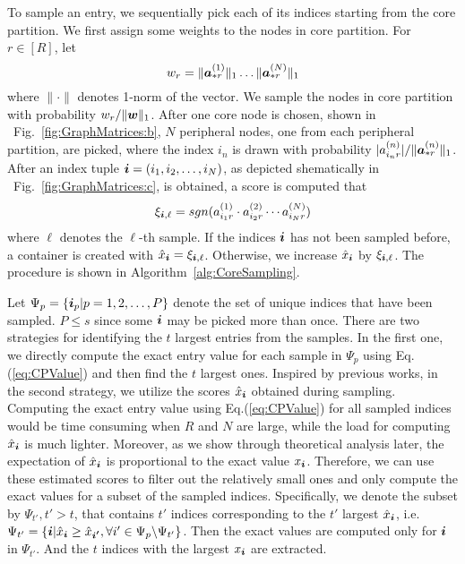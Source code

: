 \documentclass[10pt,journal,compsoc]{IEEEtran}
\newcommand{\Sca}[3]{{#1}^{(#2)}_{i_#2#3}}%
\newcommand{\anr}[2]{\Sca{a}{#1}{#2}}
\newcommand{\score}[1]{\xi_{\V{i},#1}}
\newcommand{\V}[1]{{\boldsymbol{{\MakeLowercase{#1}}}}}
\newcommand{\ColVec}[3]{\V{#1}^{(#2)}_{#3}}
\newcommand{\NormColA}[2]{\norm{\ColVec{a}{#1}{*#2}}{1}}
\newcommand{\ColVecA}[1]{\V{a}^{(#1)}_{*r}}
\newcommand{\coord}{(i_1,i_2,\ldots,i_N)}
\newcommand{\WeightR}{\NormColA{1}{r}\ldots\NormColA{N}{r}}
\newcommand{\predx}{\hat{x}_{\V{i}}}
\newcommand{\norm}[2]{\|#1\|_{#2}}
\newcommand{\Eqn}[1]{Eq.(\ref{eq:#1})}
\newcommand{\Fig}[1]{Fig.~\ref{fig:#1}}
\newcommand{\Alg}[1]{Algorithm~\ref{alg:#1}}
\begin{document}
To sample an entry, we sequentially pick each of its indices starting from the core partition. We first assign some weights to the nodes in core partition. For $r\in[R]$, let
\begin{equation}
w_r = \WeightR
\end{equation}
where $\|\cdot\|$ denotes 1-norm of the vector.
We sample the nodes in core partition with probability $w_r/\norm{\V{W}}{1}$.
After one core node is chosen, shown in ~\Fig{GraphMatrices:b},
$N$ peripheral nodes, one from each peripheral partition, are picked,
where the index $i_n$ is drawn with probability $|\anr{n}{r}|/\norm{\ColVecA{n}}{1}$.
After an index tuple $\V{i}=\coord$, as depicted shematically in ~\Fig{GraphMatrices:c}, is obtained,
a score is computed that
\begin{align}
\score{\ell}  = sgn(\anr{1}{r}\cdot\anr{2}{r}\cdots\anr{N}{r})
\end{align}
where $\ell$ denotes the $\ell$-th sample.
If the indices $\V{i}$ has not been sampled before,
a container is created with $\predx = \score{\ell}$.
Otherwise, we increase $\predx$ by $\score{\ell}$.
The procedure is shown in \Alg{CoreSampling}.

Let $\Psi_p = \{\V{i}_p|p = 1,2,\ldots,P\}$
denote the set of unique indices that have been sampled.
$P\leq s$ since some $\V{i}$ may be picked more than once.
There are two strategies for identifying the $t$ largest entries from the samples.
In the first one,
we directly compute the exact entry value for each sample in $\Psi_{p}$ using \Eqn{CPValue}
and then find the $t$ largest ones.
Inspired by previous works, in the second strategy,
we utilize the scores $\predx$ obtained during sampling.
Computing the exact entry value using \Eqn{CPValue} for all sampled indices
would be time consuming when $R$ and $N$ are large,
while the load for computing $\predx$ is much lighter.
Moreover, as we show through theoretical analysis later,
the expectation of $\predx$ is proportional to the exact value $x_{\V{i}}$.
Therefore, we can use these estimated scores to filter out the relatively small ones
and only compute the exact values for a subset of the sampled indices.
Specifically, we denote the subset by $\Psi_{t'},t'>t$,
that contains $t'$ indices corresponding to the $t'$ largest $\predx$, i.e.
$
\Psi_{t'} = \{ \V{i} | \predx \geq \hat{x}_{\V{i'}},
\forall i'\in \Psi_{p} \backslash \Psi_{t'}
\}
$.
Then the exact values  are computed only for $\V{i}$ in $\Psi_{t'}$.
And the $t$ indices with the largest $x_{\V{i}}$ are extracted.
\end{document}
